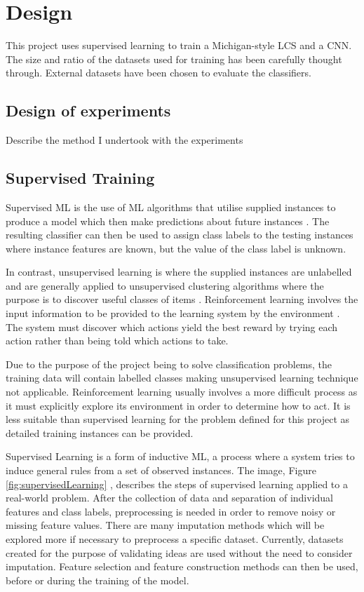 \chapter{Design}
This project uses supervised learning to train a Michigan-style LCS and a CNN. The size and ratio of the datasets used for training has been carefully thought through. External datasets have been chosen to evaluate the classifiers.

\section{Design of experiments}
Describe the method I undertook with the experiments

\section{Supervised Training}
\label{subsec:supervised}
Supervised ML is the use of ML algorithms that utilise supplied instances to produce a model which then make predictions about future instances \cite{kotsiantis2007supervised}. The resulting classifier can then be used to assign class labels to the testing instances where instance features are known, but the value of the class label is unknown.  

In contrast, unsupervised learning is where the supplied instances are unlabelled and are generally applied to unsupervised clustering algorithms where the purpose is to discover useful classes of items \cite{jain1999data}. 
Reinforcement learning involves the input information to be provided to the learning system by the environment \cite{barto1997reinforcement}. The system must discover which actions yield the best reward by trying each action rather than being told which actions to take. 

Due to the purpose of the project being to solve classification problems, the training data will contain labelled classes making unsupervised learning technique not applicable. Reinforcement learning usually involves a more difficult process as it must explicitly explore its environment in order to determine how to act.  It is less suitable than supervised learning for the problem defined for this project as detailed training instances can be provided.

Supervised Learning is a form of inductive ML, a process where a system tries to induce general rules from a set of observed instances. The image, Figure \ref{fig:supervisedLearning} \cite{kotsiantis2007supervised}, describes the steps of supervised learning applied to a real-world problem. After the collection of data and separation of individual features and class labels, preprocessing is needed in order to remove noisy or missing feature values. There are many imputation methods which will be explored more if necessary to preprocess a specific dataset. Currently, datasets created for the purpose of validating ideas are used without the need to consider imputation. Feature selection and feature construction methods can then be used, before or during the training of the model.

